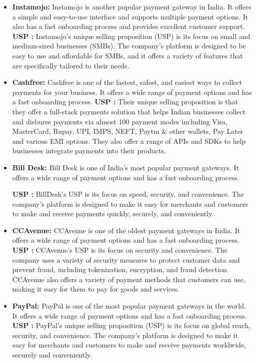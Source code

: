 \begin{enumerate}
\begin{itemize}
    \item \textbf{Instamojo:} Instamojo is another popular payment gateway in India. It offers a simple and easy-to-use interface and supports multiple payment options. It also has a fast onboarding process and provides excellent customer support.
    \textbf{USP : }Instamojo's unique selling proposition (USP) is its focus on small and medium-sized businesses (SMBs). The company's platform is designed to be easy to use and affordable for SMBs, and it offers a variety of features that are specifically tailored to their needs. 
    \item \textbf{Cashfree:} Cashfree is one of the fastest, safest, and easiest ways to collect payments for your business. It offers a wide range of payment options and has a fast onboarding process.
    \textbf{USP : } Their unique selling proposition is that they offer a full-stack payments solution that helps Indian businesses collect and disburse payments via almost 100 payment modes including Visa, MasterCard, Rupay, UPI, IMPS, NEFT, Paytm \& other wallets, Pay Later and various EMI options. They also offer a range of APIs and SDKs to help businesses integrate payments into their products.
    \item \textbf{Bill Desk:} Bill Desk is one of India's most popular payment gateways. It offers a wide range of payment options and has a fast onboarding process.

    \textbf{USP : }BillDesk's USP is its focus on speed, security, and convenience. The company's platform is designed to make it easy for merchants and customers to make and receive payments quickly, securely, and conveniently.
    
    \item \textbf{CCAvenue:} CCAvenue is one of the oldest payment gateways in India. It offers a wide range of payment options and has a fast onboarding process.
    \textbf{USP : } CCAvenue's USP is its focus on security and convenience. The company uses a variety of security measures to protect customer data and prevent fraud, including tokenization, encryption, and fraud detection. CCAvenue also offers a variety of payment methods that customers can use, making it easy for them to pay for goods and services.
    
    \item \textbf{PayPal:} PayPal is one of the most popular payment gateways in the world. It offers a wide range of payment options and has a fast onboarding process.
    \textbf{USP : }PayPal's unique selling proposition (USP) is its focus on global reach, security, and convenience. The company's platform is designed to make it easy for merchants and customers to make and receive payments worldwide, securely and conveniently.
    

\end{itemize}
\end{enumerate}
